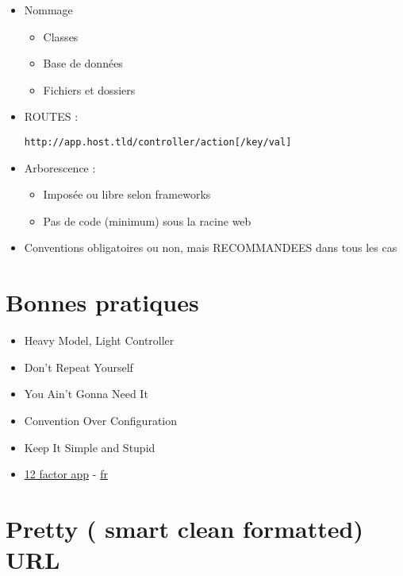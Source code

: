 \begin{itemize}
\tightlist
\item
  Nommage

  \begin{itemize}
  \tightlist
  \item
    Classes
  \item
    Base de données
  \item
    Fichiers et dossiers
  \end{itemize}
\item
  ROUTES :
  \begin{otherlanguage}{english}\texttt{http://app.host.tld/controller/action{[}/key/val{]}}\end{otherlanguage}
\item
  Arborescence :

  \begin{itemize}
  \tightlist
  \item
    Imposée ou libre selon frameworks
  \item
    Pas de code (minimum) sous la racine web
  \end{itemize}
\item
  Conventions obligatoires ou non, mais RECOMMANDEES dans tous les cas
\end{itemize}

\hypertarget{bonnes-pratiques}{%
\section{Bonnes pratiques}\label{bonnes-pratiques}}

\begin{itemize}
\tightlist
\item
  Heavy Model, Light Controller
\item
  Don't Repeat Yourself
\item
  You Ain't Gonna Need It
\item
  Convention Over Configuration
\item
  Keep It Simple and Stupid
\item
  \href{https://12factor.net/}{12 factor app} -
  \href{https://12factor.net/fr/}{fr}
\end{itemize}

\hypertarget{pretty-smart-clean-formatted-url}{%
\section{Pretty ( \textbar{} smart \textbar{} clean \textbar{}
formatted) URL}\label{pretty-smart-clean-formatted-url}}

